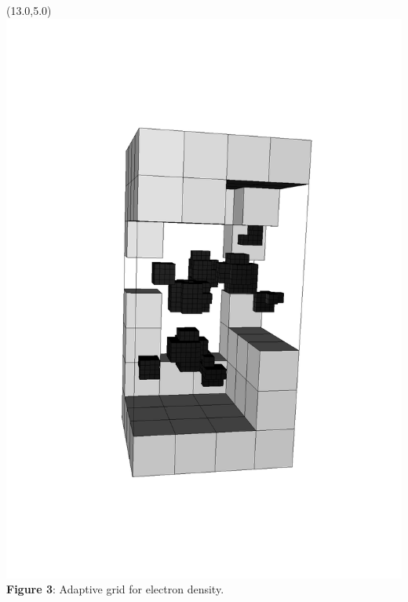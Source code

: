 \documentclass[a0,draft,portrait]{a0poster}
\begin{document}
\begin{textblock}{3.0}(13.0,5.0)
    \includegraphics[angle=-90, scale=1.00, viewport = 170 150 470 700, clip]{figures/grid.pdf}
    \footnotesize
    \centering
    \\\textbf{Figure 3}: Adaptive grid for electron density.
\end{textblock} 
\end{document}
